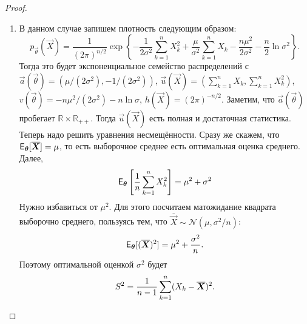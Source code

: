 \begin{proof}
\begin{enumerate}[label=(\alph*)]
		\item В данном случае запишем плотность следующим образом:
		\[
			p_{\vec{\theta}}(\vec{X})
			= \frac{1}{(2\pi)^{n/2}}\exp\left\{-\frac{1}{2\sigma^{2}}\sum_{k = 1}^{n} X_{k}^{2} + \frac{\mu}{\sigma^{2}}\sum_{k = 1}^{n} X_{k} - \frac{n\mu^{2}}{2\sigma^{2}} - \frac{n}{2}\ln \sigma^{2}\right\}.
		\]
		Тогда это будет экспоненциальное семейство распределений с $\vec{a}(\vec{\theta}) = (\mu/(2\sigma^{2}), -1/(2\sigma^{2}))$, $\vec{u}(\vec{X}) = (\sum_{k = 1}^{n} X_{k}, \sum_{k = 1}^{n} X_{k}^{2})$, $v(\vec{\theta}) = -n\mu^{2}/(2\sigma^{2}) - n\ln\sigma$, $h(\vec{X}) = (2\pi)^{-n/2}$. Заметим, что $\vec{a}(\vec{\theta})$ пробегает $\mathbb{R} \times \mathbb{R}_{++}$. Тогда $\vec{u}(\vec{X})$ есть полная и достаточная статистика. Теперь надо решить уравнения несмещённости. Сразу же скажем, что $\EE_{\vec{\theta}}[\overline{\vec{X}}] = \mu$, то есть выборочное среднее есть оптимальная оценка среднего. Далее,
		\[
			\EE_{\vec{\theta}}\left[\frac{1}{n}\sum_{k = 1}^{n} X_{k}^{2}\right] = \mu^{2} + \sigma^{2}
		\]
		Нужно избавиться от $\mu^{2}$. Для этого посчитаем матожидание квадрата выборочно среднего, пользуясь тем, что $\overline{\vec{X}} \sim \mathcal{N}(\mu, \sigma^{2}/n)$:
		\[
			\EE_{\vec{\theta}}[(\overline{\vec{X}})^{2}]
			= \mu^{2} + \frac{\sigma^{2}}{n}.
		\]
		Поэтому оптимальной оценкой $\sigma^{2}$ будет
		\[
			S^{2}
			= \frac{1}{n - 1}\sum_{k = 1}^{n}(X_{k} - \overline{\vec{X}})^{2}. \qedhere
		\]
	\end{enumerate}
\end{proof}